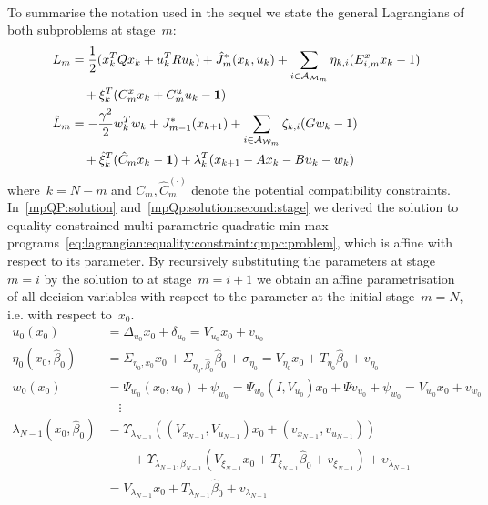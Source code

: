 %
\\[1em]
%
To summarise the notation used in the sequel we state the general Lagrangians of both subproblems at stage~$m$:
%
\begin{equation}\label{eq:lagrangian:equality:constraint:qmpc:problem}
	\begin{aligned}
	L_m &= \frac{1}{2} (x_k^TQx_k + u_k^TRu_k) + \hat J_m^\ast(x_k,u_k)+ \sum_{i\in\mathcal A_{\mathcal M_m}}\eta_{k,i}(E_{i,m}^x x_k- 1)\\&\quad + \xi_k^T(C_m^x x_k+ C_m^u u_k -\mathbf{1})\\
	\hat L_m &= -\frac{\gamma^2}{2}w_k^Tw_k + J_{m-1}^\ast(x_{k+1}) + \sum_{i\in\mathcal A_{\mathcal W_m}}\zeta_{k,i}(G w_k - 1)\\&\quad + \hat\xi_k^T(\hat C_m x_k - \mathbf{1}) + \lambda_{k}^T(x_{k+1}-Ax_k-Bu_k-w_k)
	\end{aligned}
\end{equation}
%
where~$k=N-m$ and $C_m,\hat C_m^{(\cdot)}$ denote the potential compatibility constraints.
%
In~\eqref{mpQP:solution} and~\eqref{mpQp:solution:second:stage} we derived the solution to equality constrained multi parametric quadratic min-max programs~\eqref{eq:lagrangian:equality:constraint:qmpc:problem}, which is affine with respect to its parameter.
%
By recursively substituting the parameters at stage~$m=i$ by the solution to at stage~$m=i+1$ we obtain an affine parametrisation of all decision variables with respect to the parameter at the initial stage~$m=N$, i.e. with respect to~$x_0$.
%
\begin{equation}\label{ch:mpc:qp:linesearch:all:decision:variables:parametrised}\begin{aligned}
	u_0(x_0) &= \Delta_{u_0}x_0 + \delta_{u_0} = V_{u_0}x_0 + v_{u_0}\\
	\eta_0(x_0,\hat\beta_0) &= \Sigma_{\eta_0,x_0}x_0 + \Sigma_{\eta_0,\hat\beta_0}\hat\beta_0+  \sigma_{\eta_0} = V_{\eta_0}x_0 + T_{\eta_0}\hat\beta_0 + v_{\eta_0}\\
	w_0(x_0) &= \Psi_{w_0}(x_0,u_0) + \psi_{w_0} = \Psi_{w_0}(I,V_{u_0})x_0 + \Psi v_{u_0} + \psi_{w_0} = V_{w_0}x_0+v_{w_0}\\
	&\quad\vdots\\
	\lambda_{N-1}(x_0,\hat\beta_0) &= \Upsilon_{\lambda_{N-1}}((V_{x_{N-1}},V_{u_{N-1}})x_0+(v_{x_{N-1}},v_{u_{N-1}}))\\
	&\quad\quad + \Upsilon_{\lambda_{N-1},\beta_{N-1}}(V_{\xi_{N-1}}x_0 + T_{\xi_{N-1}}\hat\beta_0+v_{\xi_{N-1}})+\upsilon_{\lambda_{N-1}}\\
	&= V_{\lambda_{N-1}}x_0+T_{\lambda_{N-1}}\hat\beta_0+v_{\lambda_{N-1}}
\end{aligned}\end{equation}
